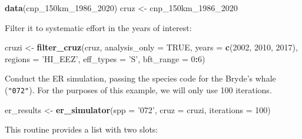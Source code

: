 \documentclass[
]{book}
\newenvironment{Shaded}{\begin{snugshade}}{\end{snugshade}}
\newcommand{\DataTypeTok}[1]{\textcolor[rgb]{0.13,0.29,0.53}{#1}}
\newcommand{\DecValTok}[1]{\textcolor[rgb]{0.00,0.00,0.81}{#1}}
\newcommand{\KeywordTok}[1]{\textcolor[rgb]{0.13,0.29,0.53}{\textbf{#1}}}
\newcommand{\NormalTok}[1]{#1}
\newcommand{\OperatorTok}[1]{\textcolor[rgb]{0.81,0.36,0.00}{\textbf{#1}}}
\newcommand{\OtherTok}[1]{\textcolor[rgb]{0.56,0.35,0.01}{#1}}
\newcommand{\StringTok}[1]{\textcolor[rgb]{0.31,0.60,0.02}{#1}}
\begin{document}
\begin{Shaded}
\begin{Highlighting}[]
\KeywordTok{data}\NormalTok{(cnp_150km_}\DecValTok{1986}\NormalTok{_}\DecValTok{2020}\NormalTok{)}
\NormalTok{cruz <-}\StringTok{ }\NormalTok{cnp_150km_}\DecValTok{1986}\NormalTok{_}\DecValTok{2020}
\end{Highlighting}
\end{Shaded}

Filter it to systematic effort in the years of interest:

\begin{Shaded}
\begin{Highlighting}[]
\NormalTok{cruzi <-}\StringTok{ }
\StringTok{  }\KeywordTok{filter_cruz}\NormalTok{(cruz,}
              \DataTypeTok{analysis_only =} \OtherTok{TRUE}\NormalTok{,}
              \DataTypeTok{years =} \KeywordTok{c}\NormalTok{(}\DecValTok{2002}\NormalTok{, }\DecValTok{2010}\NormalTok{, }\DecValTok{2017}\NormalTok{),}
              \DataTypeTok{regions =} \StringTok{'HI_EEZ'}\NormalTok{,}
              \DataTypeTok{eff_types =} \StringTok{'S'}\NormalTok{,}
              \DataTypeTok{bft_range =} \DecValTok{0}\OperatorTok{:}\DecValTok{6}\NormalTok{)}
\end{Highlighting}
\end{Shaded}

Conduct the ER simulation, passing the species code for the Bryde's whale (\texttt{"072"}). For the purposes of this example, we will only use 100 iterations.

\begin{Shaded}
\begin{Highlighting}[]
\NormalTok{er_results <-}\StringTok{ }
\StringTok{  }\KeywordTok{er_simulator}\NormalTok{(}\DataTypeTok{spp =} \StringTok{'072'}\NormalTok{, }\DataTypeTok{cruz =}\NormalTok{ cruzi, }\DataTypeTok{iterations =} \DecValTok{100}\NormalTok{)}
\end{Highlighting}
\end{Shaded}

This routine provides a list with two slots:

\begin{Shaded}
\end{Shaded}
\end{document}
